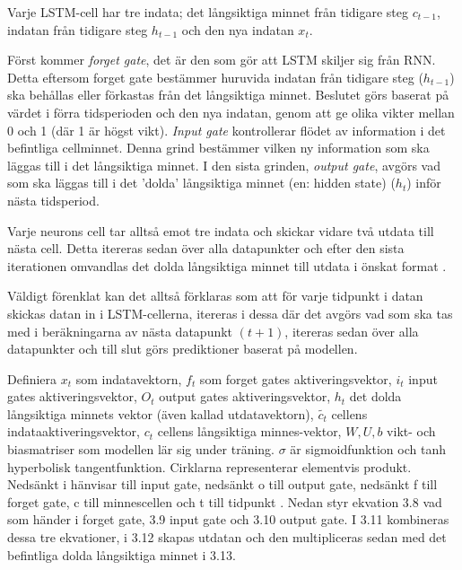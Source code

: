 \documentclass[11pt]{article}
\numberwithin{equation}{section}
\numberwithin{table}{section}
\numberwithin{figure}{section}
\begin{document}
Varje LSTM-cell har tre indata; det långsiktiga minnet från tidigare steg \(c_{t-1}\), indatan från tidigare steg \(h_{t-1}\) och den nya indatan \(x_{t}\).

Först kommer \textit{forget gate}, det är den som gör att LSTM skiljer sig från RNN. Detta eftersom forget gate bestämmer huruvida indatan från tidigare steg (\(h_{t-1}\)) ska behållas eller förkastas från det långsiktiga minnet. Beslutet görs baserat på värdet i förra tidsperioden och den nya indatan, genom att ge olika vikter mellan 0 och 1 (där 1 är högst vikt). \textit{Input gate} kontrollerar flödet av information i det befintliga cellminnet. Denna grind bestämmer vilken ny information som ska läggas till i det långsiktiga minnet. I den sista grinden, \textit{output gate}, avgörs vad som ska läggas till i det 'dolda' långsiktiga minnet (en: hidden state) (\(h_{t}\)) inför nästa tidsperiod.

Varje neurons cell tar alltså emot tre indata och skickar vidare två utdata till nästa cell. Detta itereras sedan över alla datapunkter och efter den sista iterationen omvandlas det dolda långsiktiga minnet till utdata i önskat format \parencite[][,s.478-559]{purkait2019hands}.

Väldigt förenklat kan det alltså förklaras som  att för varje tidpunkt i datan skickas datan in i LSTM-cellerna, itereras i dessa där det avgörs vad som ska tas med i beräkningarna av nästa datapunkt $(t+1)$, itereras sedan över alla datapunkter och till slut görs prediktioner baserat på modellen. 

Definiera \(x_t\) som indatavektorn, \(f_t\) som forget gates aktiveringsvektor, \(i_t\) input gates aktiveringsvektor, \(O_t\) output gates aktiveringsvektor, \(h_t\) det dolda långsiktiga minnets vektor (även kallad utdatavektorn), \(\tilde{c_t}\) cellens indataaktiveringsvektor, \(c_t\) cellens långsiktiga minnes-vektor, \(W, U, b\) vikt- och biasmatriser som modellen lär sig under träning. \(\sigma\) är sigmoidfunktion och tanh hyperbolisk tangentfunktion. Cirklarna representerar elementvis produkt. Nedsänkt i hänvisar till input gate, nedsänkt o till output gate, nedsänkt f till forget gate, c till minnescellen och t till tidpunkt \parencite[][,s.478-559]{purkait2019hands}. Nedan styr ekvation 3.8 vad som händer i forget gate, 3.9 input gate och 3.10 output gate. I 3.11 kombineras dessa tre ekvationer, i 3.12 skapas utdatan och den multipliceras sedan med det befintliga dolda långsiktiga minnet i 3.13.
\end{document}
